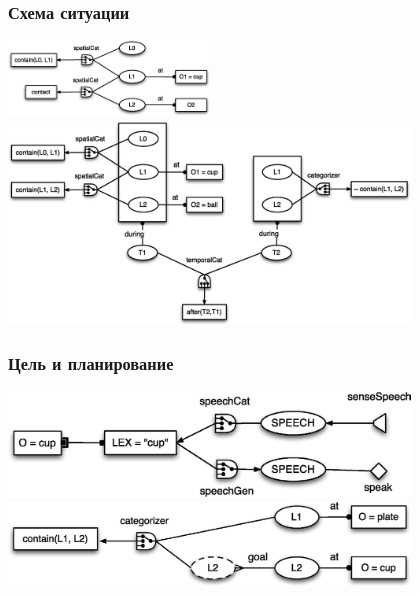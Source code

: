 \documentclass[default]{beamer}
\begin{document}
	\begin{frame}
		\frametitle{Схема ситуации}

		\begin{center}
			\includegraphics[width=0.4\textwidth]{roy_situation_1}
			\vspace{5mm}
			\includegraphics[width=0.8\textwidth]{roy_situation_2}
		\end{center}
	\end{frame}

	\begin{frame}
		\frametitle{Цель и планирование}
		
		\begin{center}
			\includegraphics[width=0.8\textwidth]{roy_grounded}
			\vspace{2cm}
			\includegraphics[width=0.8\textwidth]{roy_goal}
		\end{center}
	\end{frame}
			
\end{document}
